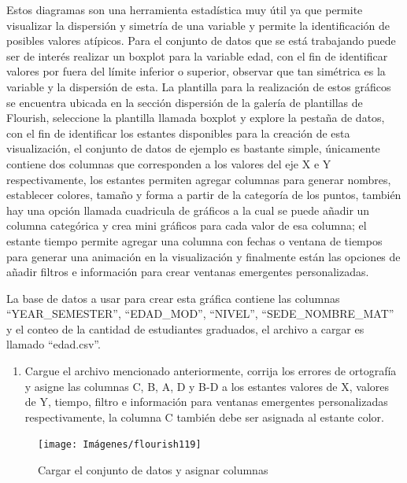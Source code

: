 \documentclass[
]{book}
\providecommand{\tightlist}{%
  \setlength{\itemsep}{0pt}\setlength{\parskip}{0pt}}
\begin{document}
Estos diagramas son una herramienta estadística muy útil ya que permite visualizar la dispersión y simetría de una variable y permite la identificación de posibles valores atípicos. Para el conjunto de datos que se está trabajando puede ser de interés realizar un boxplot para la variable edad, con el fin de identificar valores por fuera del límite inferior o superior, observar que tan simétrica es la variable y la dispersión de esta. La plantilla para la realización de estos gráficos se encuentra ubicada en la sección dispersión de la galería de plantillas de Flourish, seleccione la plantilla llamada boxplot y explore la pestaña de datos, con el fin de identificar los estantes disponibles para la creación de esta visualización, el conjunto de datos de ejemplo es bastante simple, únicamente contiene dos columnas que corresponden a los valores del eje X e Y respectivamente, los estantes permiten agregar columnas para generar nombres, establecer colores, tamaño y forma a partir de la categoría de los puntos, también hay una opción llamada cuadricula de gráficos a la cual se puede añadir un columna categórica y crea mini gráficos para cada valor de esa columna; el estante tiempo permite agregar una columna con fechas o ventana de tiempos para generar una animación en la visualización y finalmente están las opciones de añadir filtros e información para crear ventanas emergentes personalizadas.

La base de datos a usar para crear esta gráfica contiene las columnas ``YEAR\_SEMESTER'', ``EDAD\_MOD'', ``NIVEL'', ``SEDE\_NOMBRE\_MAT'' y el conteo de la cantidad de estudiantes graduados, el archivo a cargar es llamado ``edad.csv''.

\begin{enumerate}
\def\labelenumi{\arabic{enumi}.}
\tightlist
\item
  Cargue el archivo mencionado anteriormente, corrija los errores de ortografía y asigne las columnas C, B, A, D y B-D a los estantes valores de X, valores de Y, tiempo, filtro e información para ventanas emergentes personalizadas respectivamente, la columna C también debe ser asignada al estante color.
\end{enumerate}

\begin{figure}

{\centering \texttt{[image: Imágenes/flourish119]} 

}

\caption{Cargar el conjunto de datos y asignar columnas}\label{fig:paso1boxplotflourish-fig}
\end{figure}
\end{document}
